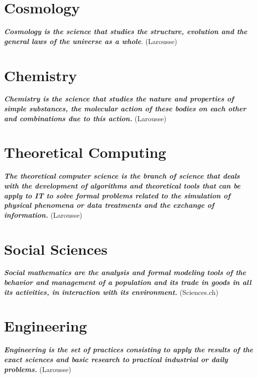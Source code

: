 \documentclass[12pt,a4paper,twoside,openright]{report}
\theoremstyle{definition}
\theoremstyle{itexmp}
\numberwithin{equation}{section}
\begin{document}
   \chapter{Cosmology}
	\label{cosmology}
	\textit{\textbf{Cosmology is the science that studies the structure, evolution and the general laws of the universe as a whole}}. (Larousse)
	\minitoc
	\pagebreak
	

	
   \chapter{Chemistry}
	\label{chemistry}
	\textit{\textbf{Chemistry is the science that studies the nature and properties of simple substances, the molecular action of these bodies on each other and combinations due to this action.}} (Larousse)
	\minitoc
	\pagebreak 
	
	
	
    \chapter{Theoretical Computing}
	\label{theoretical computing}
	\textit{\textbf{The theoretical computer science is the branch of science that deals with the development of algorithms and theoretical tools that can be apply to IT to solve formal problems related to the simulation of physical phenomena or data treatments and the exchange of information.}} (Larousse)
	\minitoc
	\pagebreak 
	
	
	
   \chapter{Social Sciences}

	\textit{\textbf{Social mathematics are the analysis and formal modeling tools of the behavior and management of a population and its trade in goods in all its activities, in interaction with its environment.}} (Sciences.ch)
	\minitoc
	\pagebreak
	
	
		
   \chapter{Engineering}

	\textit{\textbf{Engineering is the set of practices consisting to apply the results of the exact sciences and basic research to practical industrial or daily problems.}} (Larousse)
	\minitoc
	\pagebreak
	
	
\end{document}
